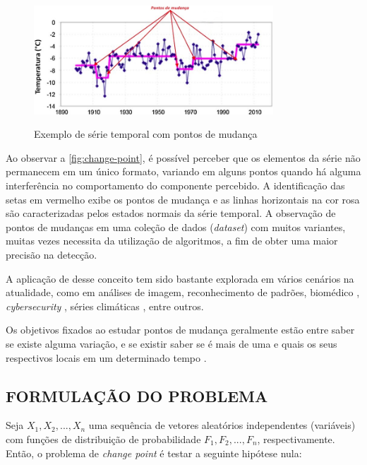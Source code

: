 \begin{figure}[!htb]
    \centering
    \caption{Exemplo de série temporal com pontos de mudança}
    \includegraphics[width=0.8\textwidth]{./dados/figuras/pontos-de-mudanca}
    \label{fig:change-point}
\end{figure}

Ao observar a \autoref{fig:change-point}, é possível perceber que os elementos da série não permanecem em um único formato, variando em alguns pontos quando há alguma interferência no comportamento do componente percebido. A identificação das setas em vermelho exibe os pontos de mudança e as linhas horizontais na cor rosa são caracterizadas pelos estados normais da série temporal. A observação de pontos de mudanças em uma coleção de dados (\textit{dataset}) com muitos variantes, muitas vezes necessita da utilização de algoritmos, a fim de obter uma maior precisão na detecção. 

A aplicação de desse conceito tem sido bastante explorada em vários cenários na atualidade, como em análises de imagem, reconhecimento de padrões, biomédico \cite{Fan2015}, \textit{cybersecurity} \cite{Polunchenko2012}, séries climáticas \cite{Bates2012}, entre outros. 

Os objetivos fixados ao estudar pontos de mudança geralmente estão entre saber se existe alguma variação, e se existir saber se é mais de uma e quais os seus respectivos locais em um determinado tempo \cite{Chen1-2000}.

\subsection{FORMULAÇÃO DO PROBLEMA}

Seja $X_1, X_2, ..., X_n$ uma sequência de vetores aleatórios independentes (variáveis) com funções de distribuição de probabilidade $F_1, F_2, ..., F_n$, respectivamente. Então, o problema de \textit{change point} é testar a seguinte hipótese nula:

